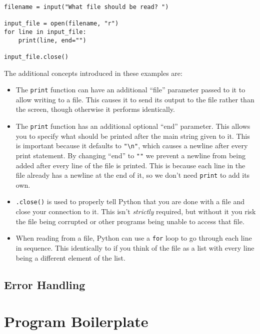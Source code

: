 \documentclass[11pt]{cselabheader}
\begin{document}
\begin{lstlisting}[style=python]
filename = input("What file should be read? ")

input_file = open(filename, "r")
for line in input_file:
    print(line, end="")

input_file.close()
\end{lstlisting}

The additional concepts introduced in these examples are:

\begin{itemize}
\item The \lstinline{print} function can have an additional ``file'' parameter passed to it to allow writing to a file. This causes it to send its output to the file rather than the screen, though otherwise it performs identically.

\item The \lstinline{print} function has an additional optional ``end'' parameter. This allows you to specify what should be printed after the main string given to it. This is important because it defaults to \lstinline{"\n"}, which causes a newline after every print statement. By changing ``end'' to \lstinline{""} we prevent a newline from being added after every line of the file is printed. This is because each line in the file already has a newline at the end of it, so we don't need \lstinline{print} to add its own.

\item \lstinline{.close()} is used to properly tell Python that you are done with a file and close your connection to it. This isn't \emph{strictly} required, but without it you risk the file being corrupted or other programs being unable to access that file.

\item When reading from a file, Python can use a \lstinline{for} loop to go through each line in sequence. This identically to if you think of the file as a list with every line being a different element of the list.
\end{itemize}


\subsection{Error Handling}


\section{Program Boilerplate}
\end{document}
